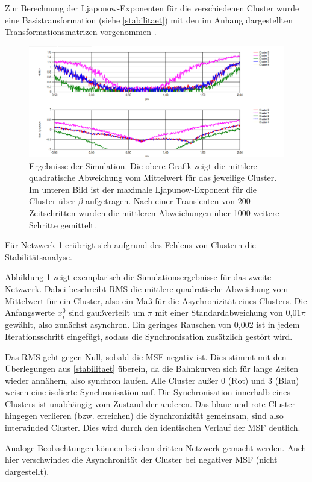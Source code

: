 Zur Berechnung der Ljaponow-Exponenten für die verschiedenen Cluster wurde eine Basistransformation (siehe \ref{stabilitaet}) mit den im Anhang dargestellten Transformationsmatrizen vorgenommen \cite{pecora2014,sagenotebook}.
\begin{figure}
	\centering
	\includegraphics[width=1.0\textwidth]{abb/misc/ljapResult.png}
	\caption{Ergebnisse der Simulation. Die obere Grafik zeigt die mittlere quadratische Abweichung vom Mittelwert für das jeweilige Cluster. Im unteren Bild ist der maximale Ljapunow-Exponent für die Cluster über $\beta$ aufgetragen. Nach einer Transienten von 200 Zeitschritten wurden die mittleren Abweichungen über 1000 weitere Schritte gemittelt.}
	\label{fig:ljapResult}
\end{figure}
Für Netzwerk 1 erübrigt sich aufgrund des Fehlens von Clustern die Stabilitätsanalyse.

Abbildung \ref{fig:ljapResult} zeigt exemplarisch die Simulationsergebnisse für das zweite Netzwerk. Dabei beschreibt RMS die mittlere quadratische Abweichung vom Mittelwert für ein Cluster, also ein Maß für die Asychronizität eines Clusters. Die Anfangswerte $x_i^0$ sind gaußverteilt um $\pi$ mit einer Standardabweichung von 0,01$\pi$ gewählt, also zunächst asynchron. Ein geringes Rauschen von 0,002 ist in jedem Iterationsschritt eingefügt, sodass die Synchronisation zusätzlich gestört wird.

Das RMS geht gegen Null, sobald die MSF negativ ist. Dies stimmt mit den Überlegungen aus \ref{stabilitaet} überein, da die Bahnkurven sich für lange Zeiten wieder annähern, also synchron laufen.
Alle Cluster außer 0 (Rot) und 3 (Blau) weisen eine isolierte Synchronisation auf. Die Synchronisation innerhalb eines Clusters ist unabhängig vom Zustand der anderen. Das blaue und rote Cluster hingegen verlieren (bzw. erreichen) die Synchronizität gemeinsam, sind also interwinded Cluster. Dies wird durch den identischen Verlauf der MSF deutlich.

Analoge Beobachtungen können bei dem dritten Netzwerk gemacht werden. Auch hier verschwindet die Asynchronität der Cluster bei negativer MSF (nicht dargestellt).


